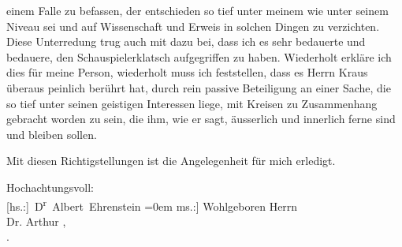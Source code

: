                einem Falle zu befassen, der entschieden so tief unter meinem wie unter seinem Niveau
               sei und auf Wissenschaft und Erweis in solchen Dingen zu verzichten. Diese
               Unterredung trug auch mit dazu bei, dass ich es sehr bedauerte und bedauere, den
               Schauspielerklatsch aufgegriffen zu haben. Wiederholt erkläre ich dies für meine
               Person, wiederholt muss ich feststellen, dass es Herrn Kraus überaus peinlich berührt hat, durch rein passive
               Beteiligung an einer Sache, die so tief unter seinen geistigen Interessen liege, mit
               Kreisen zu Zusammenhang gebracht worden zu sein, die ihm, wie er sagt, äusserlich und
               innerlich ferne sind und bleiben sollen.\pend
           
\pstart
           Mit diesen Richtigstellungen ist die Angelegenheit für mich erledigt.\pend
           
\pstart
           Hochachtungsvoll:{\\[\baselineskip]}\spacefill\mbox{{[}hs.:{]} D\textsuperscript{r} Albert Ehrenstein}\pend
           \leftskip=0em{}
\pstart
           \noindent{}{[}ms.:{]} Wohlgeboren Herrn{\\}Dr. Arthur ,{\\}.\pend
           \endnumbering{}  
      